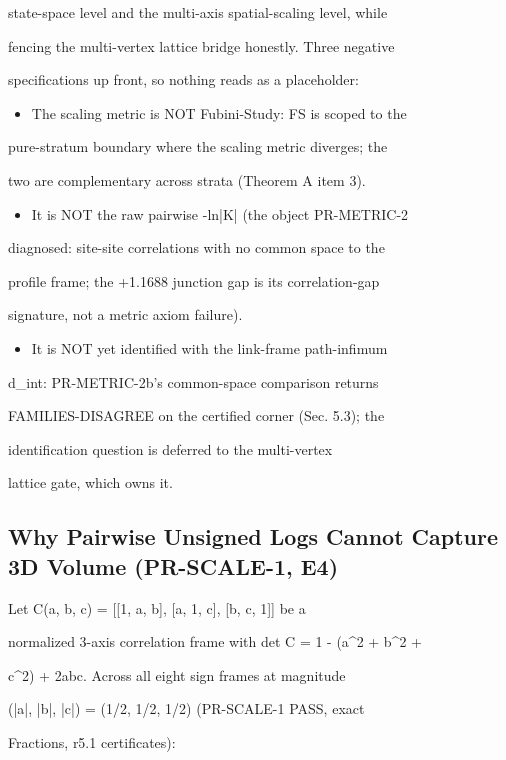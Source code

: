 \documentclass[11pt,a4paper]{article}
\theoremstyle{definition}
\begin{document}
state-space level and the multi-axis spatial-scaling level, while

fencing the multi-vertex lattice bridge honestly. Three negative

specifications up front, so nothing reads as a placeholder:


\begin{itemize}[leftmargin=1.4em]
\item The scaling metric is NOT Fubini-Study: FS is scoped to the
\end{itemize}
    pure-stratum boundary where the scaling metric diverges; the

    two are complementary across strata (Theorem A item 3).

\begin{itemize}[leftmargin=1.4em]
\item It is NOT the raw pairwise -ln|K| (the object PR-METRIC-2
\end{itemize}
    diagnosed: site-site correlations with no common space to the

    profile frame; the +1.1688 junction gap is its correlation-gap

    signature, not a metric axiom failure).

\begin{itemize}[leftmargin=1.4em]
\item It is NOT yet identified with the link-frame path-infimum
\end{itemize}
    d\_int: PR-METRIC-2b's common-space comparison returns

    FAMILIES-DISAGREE on the certified corner (Sec. 5.3); the

    identification question is deferred to the multi-vertex

    lattice gate, which owns it.


\subsection{Why Pairwise Unsigned Logs Cannot Capture 3D Volume (PR-SCALE-1, E4)}

Let C(a, b, c) = [[1, a, b], [a, 1, c], [b, c, 1]] be a

normalized 3-axis correlation frame with det C = 1 - (a\^{}2 + b\^{}2 +

c\^{}2) + 2abc. Across all eight sign frames at magnitude

(|a|, |b|, |c|) = (1/2, 1/2, 1/2) (PR-SCALE-1 PASS, exact

Fractions, r5.1 certificates):
\end{document}
